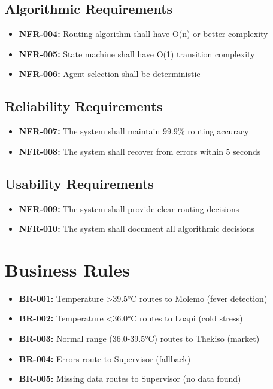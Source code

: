 \subsection{Algorithmic Requirements}

\begin{itemize}
    \item \textbf{NFR-004:} Routing algorithm shall have O(n) or better complexity
    \item \textbf{NFR-005:} State machine shall have O(1) transition complexity
    \item \textbf{NFR-006:} Agent selection shall be deterministic
\end{itemize}

\subsection{Reliability Requirements}

\begin{itemize}
    \item \textbf{NFR-007:} The system shall maintain 99.9\% routing accuracy
    \item \textbf{NFR-008:} The system shall recover from errors within 5 seconds
\end{itemize}

\subsection{Usability Requirements}

\begin{itemize}
    \item \textbf{NFR-009:} The system shall provide clear routing decisions
    \item \textbf{NFR-010:} The system shall document all algorithmic decisions
\end{itemize}

\section{Business Rules}

\begin{itemize}
    \item \textbf{BR-001:} Temperature >39.5°C routes to Molemo (fever detection)
    \item \textbf{BR-002:} Temperature <36.0°C routes to Loapi (cold stress)
    \item \textbf{BR-003:} Normal range (36.0-39.5°C) routes to Thekiso (market)
    \item \textbf{BR-004:} Errors route to Supervisor (fallback)
    \item \textbf{BR-005:} Missing data routes to Supervisor (no data found)
\end{itemize}


